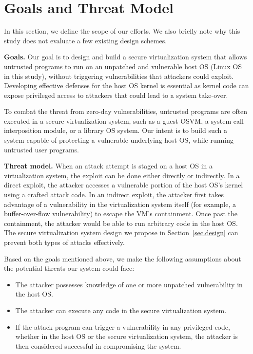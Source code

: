 \section{Goals and Threat Model}
\label{sec.motivation-and-background}

In this section, we define the scope of our efforts. We also briefly note why
this study does not evaluate a few existing design schemes.

\textbf{Goals.}
Our goal is to design and build a secure virtualization system that allows
untrusted programs to run on an unpatched and vulnerable host OS (Linux OS in
this study), without triggering vulnerabilities that attackers could exploit.
Developing effective defenses for the host OS kernel is essential as kernel code
can expose privileged access to attackers that could lead to a system take-over.

To combat the threat from zero-day vulnerabilities, untrusted programs are often executed in a
secure virtualization system, such as a guest OSVM, a system call
interposition module, or a library OS system. Our intent is to
build such a system capable of protecting a vulnerable underlying host OS,
while running untrusted user programs.


\noindent
\textbf{Threat model.}
When an attack attempt is staged
on a host OS in a virtualization system,
the exploit can be done either directly or indirectly.
In a direct exploit, the attacker accesses a vulnerable portion of the host OS's kernel
using a crafted attack code. In an indirect exploit,
the attacker first takes advantage of a vulnerability in the virtualization system itself
(for example, a buffer-over-flow vulnerability)
to escape the VM's containment. Once past the containment, the attacker would be able to run arbitrary code
in the host OS.
The secure virtualization system design we propose
in Section~\ref{sec.design} can prevent both types of attacks effectively.

Based on the goals mentioned above, we make the following assumptions about the
potential threats our system could face:

\begin{itemize}\setlength\itemsep{0em}

\item The attacker possesses knowledge of one or more unpatched
vulnerability in the host OS.

\item The attacker can execute any code in the secure
virtualization system.

\item If the attack program can trigger a vulnerability in any privileged
code, whether in the host OS or the secure virtualization system, the attacker
is then considered successful in compromising the system.

\end{itemize}

